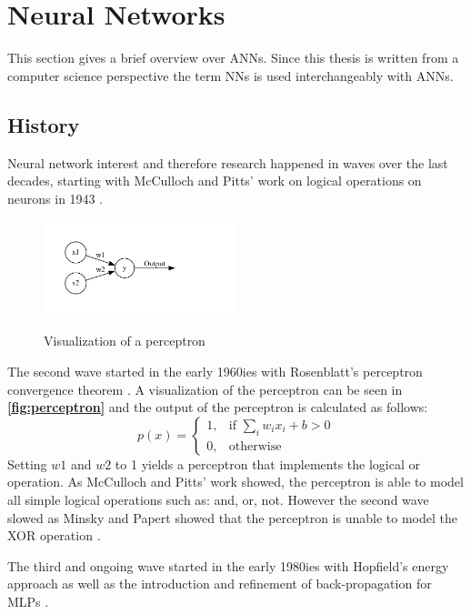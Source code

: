 \documentclass[10pt]{book}
\newcommand{\figureref}[1]{\textbf{\autoref{#1}}}
\begin{document}
\section{Neural Networks}

This section gives a brief overview over \acp{ANN}. Since this thesis is written from a computer science perspective the term \acp{NN} is used interchangeably with \acp{ANN}.

\subsection{History}

Neural network interest and therefore research happened in waves over the last decades, starting with McCulloch and Pitts' work on logical operations on neurons in 1943 \cite{mcculloch1943logical,485891}. 

\begin{figure}
  \caption{Visualization of a perceptron}
  \includegraphics[width=0.5\textwidth]{graph/rosenblatt}
  \label{fig:perceptron}
\end{figure}

The second wave started in the early 1960ies with Rosenblatt's perceptron convergence theorem \cite{rosenblatt1962principles}. A visualization of the perceptron can be seen in \figureref{fig:perceptron} and the output of the perceptron is calculated as follows:
\[
    p(x)= 
\begin{cases}
    1, & \text{if } \sum_i w_ix_i + b > 0\\
    0, & \text{otherwise}
\end{cases}
\]
Setting $w1$ and $w2$ to 1 yields a perceptron that implements the logical or operation. As McCulloch and Pitts' work showed, the perceptron is able to model all simple logical operations such as: and, or, not. However the second wave slowed as Minsky and Papert showed that the perceptron is unable to model the XOR operation \cite{minsky1969perceptron}.

The third and ongoing wave started in the early 1980ies with Hopfield's energy approach \cite{hopfield1982neural} as well as the introduction and refinement of back-propagation for \acp{MLP} \cite{werbos1974beyond,rumelhart1986parallel}.
\end{document}
